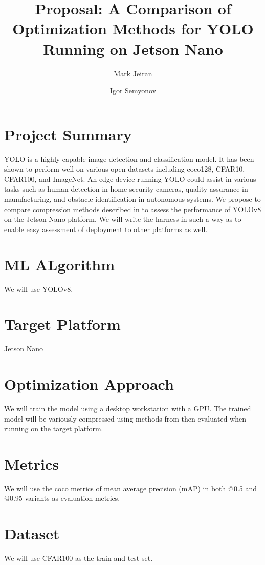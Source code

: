 \documentclass[12pt,english]{article}
\title{
    Proposal: A Comparison of Optimization Methods for YOLO Running on Jetson Nano
}
\author{Mark Jeiran}
\author{Igor Semyonov}
\affil{George Mason University}
\begin{document}
\maketitle

\section{Project Summary}

YOLO is a highly capable image detection and classification model.
It has been shown to perform well on various open datasets including coco128, CFAR10, CFAR100, and ImageNet.
An edge device running YOLO could assist in various tasks such as human detection in home security cameras, quality assurance in manufacturing, and obstacle identification in autonomous systems.
We propose to compare compression methods described in \cite{compression-methods} to assess the performance of YOLOv8 on the Jetson Nano platform.
We will write the harness in such a way as to enable easy assessment of deployment to other platforms as well.

\section{ML ALgorithm}

We will use YOLOv8.

\section{Target Platform}

Jetson Nano

\section{Optimization Approach}

We will train the model using a desktop workstation with a GPU.
The trained model will be variously compressed using methods from \cite{compression-methods} then evaluated when running on the target platform.

\section{Metrics}

We will use the coco metrics of mean average precision (mAP) in both @0.5 and @0.95 variants as evaluation metrics.

\section{Dataset}

We will use CFAR100 as the train and test set.




\end{document}
